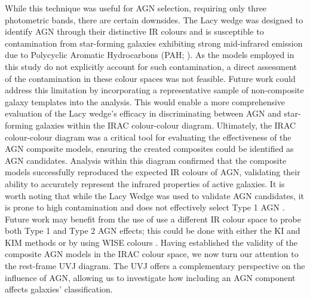 While this technique was useful for AGN selection, requiring only three photometric bands, there are certain downsides. The Lacy wedge was designed to identify AGN through their distinctive IR colours and is susceptible to contamination from star-forming galaxies exhibiting strong mid-infrared emission due to Polycyclic Aromatic Hydrocarbons (PAH; \citealt{sajina_simulating_2005}). As the models employed in this study do not explicitly account for such contamination, a direct assessment of the contamination in these colour spaces was not feasible. Future work could address this limitation by incorporating a representative sample of non-composite galaxy templates into the analysis. This would enable a more comprehensive evaluation of the Lacy wedge's efficacy in discriminating between AGN and star-forming galaxies within the IRAC colour-colour diagram. Ultimately, the IRAC colour-colour diagram was a critical tool for evaluating the effectiveness of the AGN composite models, ensuring the created composites could be identified as AGN candidates. Analysis within this diagram confirmed that the composite models successfully reproduced the expected IR colours of AGN, validating their ability to accurately represent the infrared properties of active galaxies. It is worth noting that while the Lacy Wedge was used to validate AGN candidates, it is prone to high contamination and does not effectively select Type 1 AGN \citep{donley_identifying_2012}. Future work may benefit from the use of use a different IR colour space to probe both Type 1 and Type 2 AGN effects; this could be done with either the KI and KIM methods \citep{messias_new_2012, messias_dependency_2014} or by using WISE colours \citep{caccianiga_wise_2015}. Having established the validity of the composite AGN models in the IRAC colour space, we now turn our attention to the rest-frame UVJ diagram. The UVJ offers a complementary perspective on the influence of AGN, allowing us to investigate how including an AGN component affects galaxies' classification.
